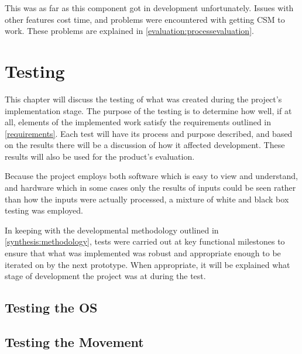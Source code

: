 				This was as far as this component got in development unfortunately. Issues with other features cost time, and problems were encountered with getting CSM to work. These problems are explained in \ref{evaluation:processevaluation}.
				
	
	\chapter{Testing}
	This chapter will discuss the testing of what was created during the project's implementation stage. The purpose of the testing is to determine how well, if at all, elements of the implemented work satisfy the requirements outlined in \ref{requirements}. Each test will have its process and purpose described, and based on the results there will be a discussion of how it affected development. These results will also be used for the product's evaluation.
	
	Because the project employs both software which is easy to view and understand, and hardware which in some cases only the results of inputs could be seen rather than how the inputs were actually processed, a mixture of white and black box testing was employed.
	
	In keeping with the developmental methodology outlined in \ref{synthesis:methodology}, tests were carried out at key functional milestones to ensure that what was implemented was robust and appropriate enough to be iterated on by the next prototype. When appropriate, it will be explained what stage of development the project was at during the test.
	
	
		\section{Testing the OS}
		
		\section{Testing the Movement}
			
